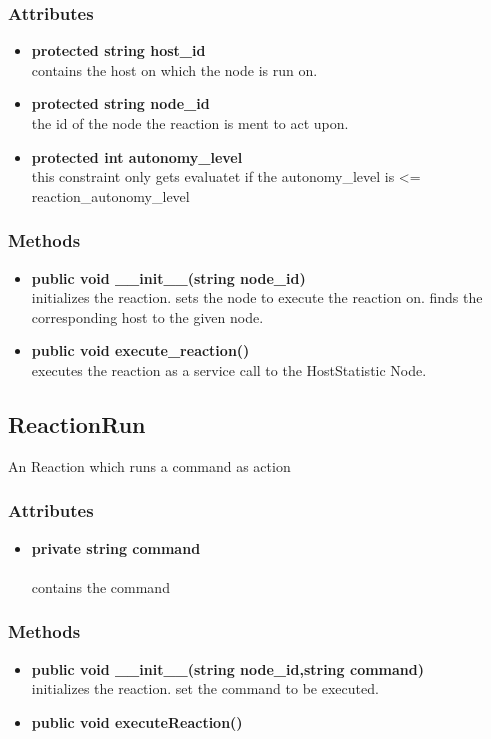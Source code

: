 \subsubsection{Attributes}
\begin{itemize}
	\item \textbf{ protected string host\_id }\\
		contains the host on which the node is run on.
	\item \textbf{ protected string node\_id }\\
		the id of the node the reaction is ment to act upon.
	\item \textbf{ protected int autonomy\_level }\\
		this constraint only gets evaluatet if 
		the autonomy\_level is <= reaction\_autonomy\_level
\end{itemize}
\subsubsection{Methods}
\begin{itemize}
	\item \textbf{ public void \_\_init\_\_(string node\_id) }\\
		initializes the reaction. sets the node to execute the reaction on. finds the corresponding host to the given node.
	\item \textbf{ public void execute\_reaction() }\\
		executes the reaction as a service call to the HostStatistic Node.
\end{itemize}


\subsection{ReactionRun}
	An Reaction which runs a command as action 
\subsubsection{Attributes}
\begin{itemize}
	\item \textbf{ private string command }\\
	\\ contains the command
\end{itemize}
\subsubsection{Methods}
\begin{itemize}
	\item \textbf{ public void \_\_init\_\_(string node\_id,string command) }\\
		initializes the reaction. set the command to be executed.
	\item \textbf{ public void executeReaction() }\\
\end{itemize}


